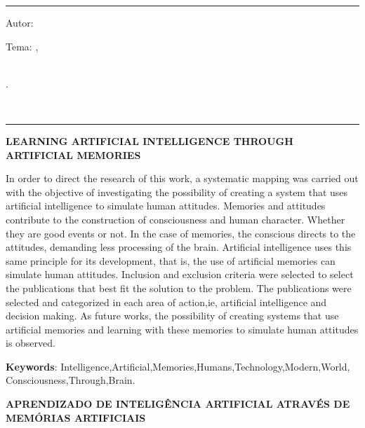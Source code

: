

\hrule	%
\begin{center} %
\begin{minipage}[c]{12.5cm} %
Autor: \imprimirautor

Tema: \imprimirtitulo 
\imprimirlocal,\\ 
\imprimirorientador\\
\hspace{0.5cm}
\parbox[t]{\textwidth}{\imprimirinstituicao
\imprimirdata.}\\
\hspace{0.5cm}
\end{minipage}
\end{center}
\hrule

\vspace{1cm}

\SingleSpacing
\noindent
{\textbf{LEARNING ARTIFICIAL INTELLIGENCE THROUGH ARTIFICIAL MEMORIES}}
\indent
\small

In order to direct the research of this work, a systematic mapping was carried out with the objective of investigating the possibility of creating a system that uses artificial intelligence to simulate human attitudes. Memories and attitudes contribute to the construction of consciousness and human character. Whether they are good events or not. In the case of memories, the conscious directs to the attitudes, demanding less processing of the brain. Artificial intelligence uses this same principle for its development, that is, the use of artificial memories can simulate human attitudes. Inclusion and exclusion criteria were selected to select the publications that best fit the solution to the problem. The publications were selected and categorized in each area of action,ie, artificial intelligence and decision making. As future works, the possibility of creating systems that use artificial memories and learning with these memories to simulate human attitudes is observed.

\noindent
 
\textbf{Keywords}: Intelligence,Artificial,Memories,Humans,Technology,Modern,World,
\\Consciousness,Through,Brain.

\SingleSpacing
\noindent
{\textbf{APRENDIZADO DE INTELIGÊNCIA ARTIFICIAL ATRAVÉS DE MEMÓRIAS ARTIFICIAIS}}
\indent
\small

